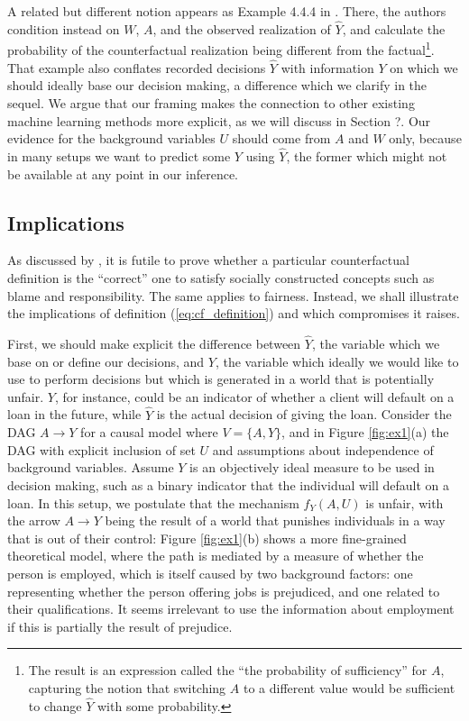 A related but different notion appears as Example 4.4.4 in
\citep{pearl:16}. There, the authors condition instead on $W$, $A$,
and the observed realization of $\hat Y$, and calculate the
probability of the counterfactual realization being different from the
factual\footnote{The result is an expression called the ``the
  probability of sufficiency'' for $A$, capturing the notion that
  switching $A$ to a different value would be sufficient to change
  $\hat Y$ with some probability.}. That example also conflates
recorded decisions $\hat Y$ with information $Y$ on which we should ideally
base our decision making, a difference which we clarify in the
sequel. We argue that our framing makes the connection to other
existing machine learning methods more explicit, as we will discuss in
Section ?. Our evidence for the background variables $U$ should come from
$A$ and $W$ only, because in many setups we want to predict some $Y$
using $\hat Y$, the former which might not be available at any point
in our inference.

\subsection{Implications}
%
As discussed by \cite{halpern:16}, it is futile to prove whether a
particular counterfactual definition is the ``correct'' one to satisfy
socially constructed concepts such as blame and responsibility. The
same applies to fairness. Instead, we shall illustrate the
implications of definition (\ref{eq:cf_definition}) and which
compromises it raises.

First, we should make explicit the difference between $\hat Y$, the
variable which we base on or define our decisions, and $Y$, the variable which
ideally we would like to use to perform decisions but which is
generated in a world that is potentially unfair. $Y$, for instance,
could be an indicator of whether a client will default on a loan in
the future, while $\hat Y$ is the actual decision of giving the
loan. Consider the DAG $A \rightarrow Y$ for a causal model where $V =
\{A, Y\}$, and in Figure \ref{fig:ex1}(a) the DAG with explicit
inclusion of set $U$ and assumptions about independence of background
variables. Assume $Y$ is an objectively ideal measure to be used in
decision making, such as a binary indicator that the individual will
default on a loan. In this setup, we postulate that the mechanism
$f_Y(A, U)$ is unfair, with the arrow $A \rightarrow Y$ being the
result of a world that punishes individuals in a way that is out of
their control: Figure \ref{fig:ex1}(b) shows a more fine-grained
theoretical model, where the path is mediated by a measure of
whether the person is employed, which is itself caused by
two background factors: one representing whether the person offering jobs is
prejudiced, and one related to their qualifications. It seems irrelevant
to use the information about employment if this is partially the result
of prejudice.

